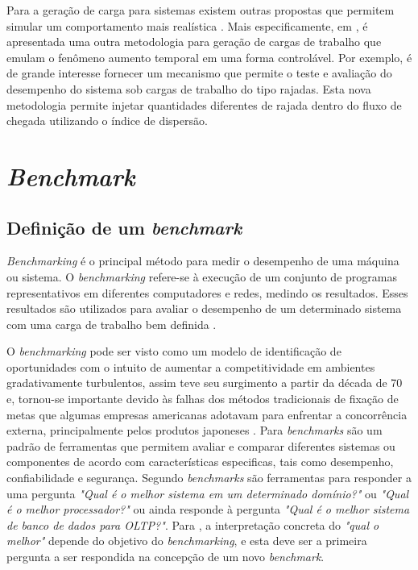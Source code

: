Para a geração de carga para sistemas existem outras propostas que permitem simular um comportamento mais realística \cite{Mi2010, Mi2009,Mi2008}. Mais especificamente, em \cite{Menasce2002}, é apresentada uma outra metodologia para geração de cargas de trabalho que emulam o fenômeno aumento temporal em uma forma controlável. Por exemplo, é de grande interesse fornecer um mecanismo que permite o teste e avaliação do desempenho do sistema sob cargas de trabalho do tipo rajadas. Esta nova metodologia permite injetar quantidades diferentes de rajada dentro do fluxo de chegada utilizando o índice de dispersão. 

\section{\textit{Benchmark}}
\subsection{Definição de um \textit{benchmark}}
\textit{Benchmarking} é o principal método para medir o desempenho de uma máquina ou sistema. O \textit{benchmarking} refere-se à execução de um conjunto de programas representativos em diferentes computadores e redes, medindo os resultados. Esses resultados são utilizados para avaliar o desempenho de um determinado sistema com uma carga de trabalho bem definida \cite{Menasce2001}.

O \textit{benchmarking} pode ser visto como um modelo de identificação de oportunidades com o intuito de aumentar a competitividade em ambientes gradativamente turbulentos, assim teve seu surgimento a partir da década de 70 e, tornou-se importante devido às falhas dos métodos tradicionais de fixação de metas que algumas empresas americanas adotavam para enfrentar a concorrência externa, principalmente pelos produtos japoneses \cite{Camila2008}. Para \cite{Marco2012} \textit{benchmarks} são um padrão de ferramentas que permitem avaliar e comparar diferentes sistemas ou componentes de acordo com características especificas, tais como desempenho, confiabilidade e segurança. Segundo \cite{Folkerts2013} \textit{benchmarks} são ferramentas para responder a uma pergunta \textit{"Qual é o melhor sistema em um determinado domínio?"} ou  \textit{"Qual é o melhor processador?"} ou ainda responde à pergunta \textit{"Qual é o melhor sistema de banco de dados para OLTP?"}. Para \cite{Folkerts2013}, a interpretação concreta do  \textit{"qual o melhor"} depende do objetivo do \textit{benchmarking}, e esta deve ser a primeira pergunta a ser respondida na concepção de um novo \textit{benchmark}. 



